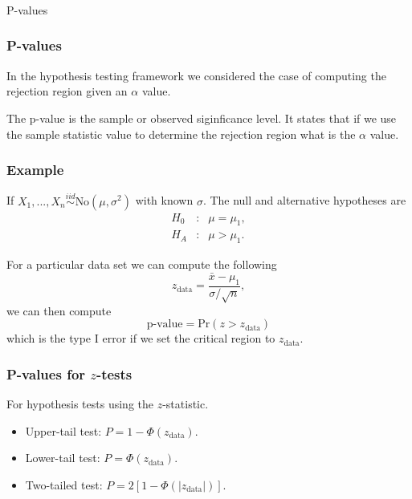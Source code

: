 \begin{frame}[fragile]\frametitle{}
\begin{center}
{\Large P-values}

\end{center}
\end{frame}



\begin{frame}[fragile]\frametitle{P-values}


In the hypothesis testing framework we considered the case of
computing the rejection region given an $\alpha$ value. 

\vspace{.1in}

The p-value is the sample or observed siginficance level.
It states that if we use the sample statistic value to
determine the rejection region what is the $\alpha$ 
value.

\end{frame}


\begin{frame}[fragile]\frametitle{Example}
{\tiny 
If $X_1,...,X_n \stackrel{iid}{\sim} \mbox{No}(\mu,\sigma^2)$
with known $\sigma$.
The null and alternative hypotheses are
\begin{eqnarray*}
H_0&:& \mu= \mu_1, \\
H_A&:& \mu >  \mu_1.
\end{eqnarray*}

For a particular data set we can compute the following
$$z_{\mbox{data}} = \frac{\bar{x}-\mu_1}{\sigma/\sqrt{n}},$$
we can then compute 
$$\mbox{p-value} = \mbox{Pr}(z > z_{\mbox{data}})$$
which is the type I error if we set the critical
region to $z_{\mbox{data}}.$


}
\end{frame}


\begin{frame}[fragile]\frametitle{P-values for $z$-tests}

For hypothesis tests using the $z$-statistic.

\begin{itemize}

\item Upper-tail test: $P = 1- \Phi(z_{\mbox{data}})$.
\item Lower-tail test: $P = \Phi(z_{\mbox{data}})$.
\item Two-tailed test: $P = 2[1-\Phi(|z_{\mbox{data}}|)]$.

\end{itemize}

\end{frame}



